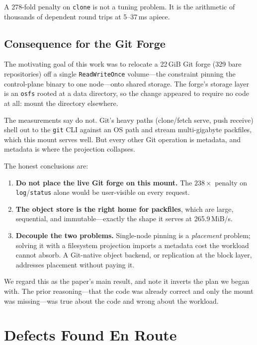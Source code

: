 \documentclass[11pt]{article}
\begin{document}
A 278-fold penalty on \texttt{clone} is not a tuning problem. It is
the arithmetic of thousands of dependent round trips at 5--37\,ms
apiece.

\subsection{Consequence for the Git Forge}

The motivating goal of this work was to relocate a 22\,GiB Git forge
(329 bare repositories) off a single \texttt{ReadWriteOnce} volume---the
constraint pinning the control-plane binary to one node---onto shared
storage. The forge's storage layer is an \texttt{osfs} rooted at a data
directory, so the change appeared to require no code at all: mount the
directory elsewhere.

The measurements say do not. Git's heavy paths (clone/fetch serve, push
receive) shell out to the \texttt{git} CLI against an OS path and stream
multi-gigabyte packfiles, which this mount serves well. But every other Git
operation is metadata, and metadata is where the projection collapses.

The honest conclusions are:
\begin{enumerate}
  \item \textbf{Do not place the live Git forge on this mount.} The
        \(238\times\) penalty on \texttt{log}/\texttt{status} alone would be
        user-visible on every request.
  \item \textbf{The object store is the right home for packfiles}, which are
        large, sequential, and immutable---exactly the shape it serves at
        265.9\,MiB/s.
  \item \textbf{Decouple the two problems.} Single-node pinning is a
        \emph{placement} problem; solving it with a filesystem projection
        imports a metadata cost the workload cannot absorb. A Git-native
        object backend, or replication at the block layer, addresses
        placement without paying it.
\end{enumerate}

We regard this as the paper's main result, and note it inverts the plan we
began with. The prior reasoning---that the code was already correct and only
the mount was missing---was true about the code and wrong about the
workload.

\section{Defects Found En Route}
\end{document}
